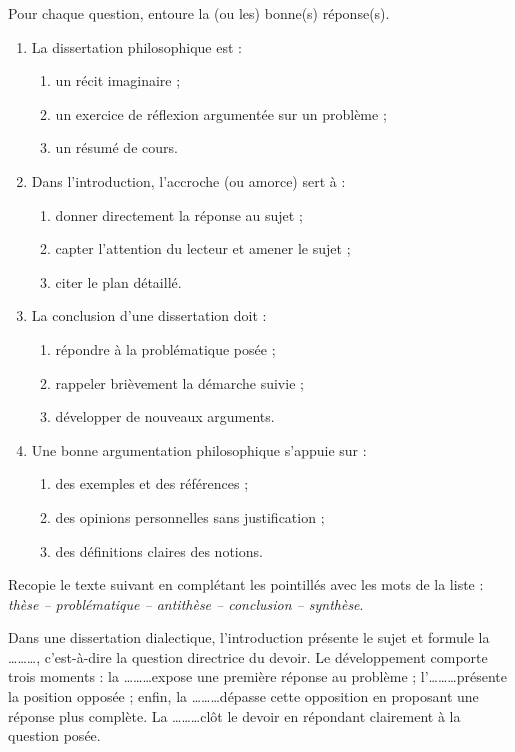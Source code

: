 \documentclass[11pt]{article}
\begin{document}
\begin{exercice}[QCM]
Pour chaque question, entoure la (ou les) bonne(s) réponse(s).
\begin{enumerate}
\item La dissertation philosophique est :
\begin{enumerate}
\item[a)] un récit imaginaire ;
\item[b)] un exercice de réflexion argumentée sur un problème ;
\item[c)] un résumé de cours.
\end{enumerate}
\item Dans l'introduction, l'accroche (ou amorce) sert à :
\begin{enumerate}
\item[a)] donner directement la réponse au sujet ;
\item[b)] capter l'attention du lecteur et amener le sujet ;
\item[c)] citer le plan détaillé.
\end{enumerate}
\item La conclusion d'une dissertation doit :
\begin{enumerate}
\item[a)] répondre à la problématique posée ;
\item[b)] rappeler brièvement la démarche suivie ;
\item[c)] développer de nouveaux arguments.
\end{enumerate}
\item Une bonne argumentation philosophique s'appuie sur :
\begin{enumerate}
\item[a)] des exemples et des références ;
\item[b)] des opinions personnelles sans justification ;
\item[c)] des définitions claires des notions.
\end{enumerate}
\end{enumerate}
\end{exercice}

\begin{exercice}
Recopie le texte suivant en complétant les pointillés avec les mots de la liste : \textit{thèse -- problématique -- antithèse -- conclusion -- synthèse}.

\og Dans une dissertation dialectique, l'introduction présente le sujet et formule la \ldots\ldots\ldots, c'est-à-dire la question directrice du devoir. Le développement comporte trois moments : la \ldots\ldots\ldots expose une première réponse au problème ; l'\ldots\ldots\ldots présente la position opposée ; enfin, la \ldots\ldots\ldots dépasse cette opposition en proposant une réponse plus complète. La \ldots\ldots\ldots clôt le devoir en répondant clairement à la question posée. \fg
\end{exercice}
\end{document}
